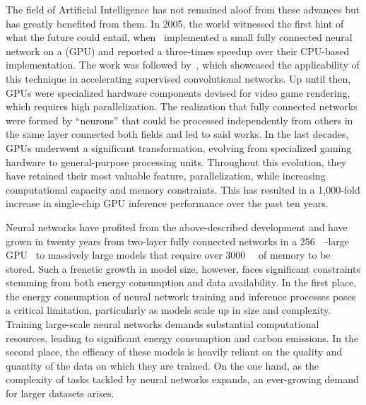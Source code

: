 The field of Artificial Intelligence has not remained aloof from these advances but has greatly benefited from them. In 2005, the world witnessed the first hint of what the future could entail, when~ implemented a small fully connected neural network on a  (GPU) and reported a three-times speedup over their CPU-based implementation. The work was followed by~, which showcased the applicability of this technique in accelerating supervised convolutional networks. Up until then, GPUs were specialized hardware components devised for video game rendering, which requires high parallelization. The realization that fully connected networks were formed by ``neurons'' that could be processed independently from others in the same layer connected both fields and led to said works. In the last decades, GPUs underwent a significant transformation, evolving from specialized gaming hardware to general-purpose processing units. Throughout this evolution, they have retained their most valuable feature, parallelization, while increasing computational capacity and memory constraints. This has resulted in a 1,000-fold increase in single-chip GPU inference performance over the past ten years.


Neural networks have profited from the above-described development and have grown in twenty years from two-layer fully connected networks in a \qty{256}{\mega\byte}-large GPU~ to massively large models that require over \qty{3000}{\giga\byte} of memory to be stored. Such a frenetic growth in model size, however, faces significant constraints stemming from both energy consumption and data availability. In the first place, the energy consumption of neural network training and inference processes poses a critical limitation, particularly as models scale up in size and complexity. Training large-scale neural networks demands substantial computational resources, leading to significant energy consumption and carbon emissions. In the second place, the efficacy of these models is heavily reliant on the quality and quantity of the data on which they are trained. On the one hand, as the complexity of tasks tackled by neural networks expands, an ever-growing demand for larger datasets arises.

